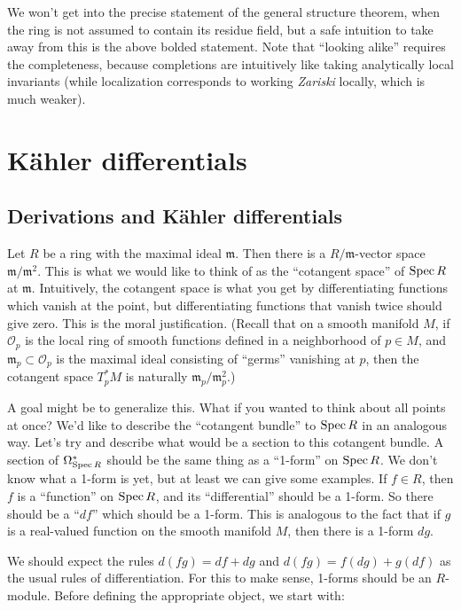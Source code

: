 We won't get into the precise statement of the general structure theorem, when
the ring is not assumed to contain its residue field, but a safe
intuition to take away from this is the above bolded statement.
Note that ``looking alike'' requires the completeness, because completions are
intuitively like taking analytically local invariants (while localization
corresponds to working \emph{Zariski} locally, which is much weaker).


\section{K\"ahler differentials}
\subsection{Derivations and K\"ahler differentials} Let $R$ be a ring with the maximal ideal
$\mathfrak{m}$. Then there is a $R/\mathfrak{m}$-vector space
$\mathfrak{m}/\mathfrak{m}^2$. This is what we would like to think of as the
``{cotangent space}'' of $\operatorname{Spec} R$ at $\mathfrak{m}$. Intuitively, the
cotangent space is what you get by differentiating functions which vanish at
the point, but
differentiating functions that vanish twice should give zero. This is the moral
justification.
(Recall that on a smooth manifold $M$, if $\mathcal{O}_p$ is the local ring of
smooth functions defined in a neighborhood of $p \in M$, and $\mathfrak{m}_p
\subset \mathcal{O}_p$ is the maximal ideal consisting of ``germs'' vanishing
at $p$, then the cotangent space $T_p^* M$ is naturally
$\mathfrak{m}_p/\mathfrak{m}_p^2$.)

A goal might be to generalize this. What if you wanted to think about all
points at once? We'd like to describe the ``cotangent bundle'' to $\operatorname{Spec} R$ in
an analogous way. Let's try and describe what would be a section to this
cotangent bundle. A section of $\Omega^*_{\operatorname{Spec} R}$ should be the same
thing as a ``1-form'' on $\operatorname{Spec} R$. We don't know what a 1-form is yet, but at
least we can give some examples. If $f \in R$, then $f$ is a ``function'' on
$\operatorname{Spec} R$, and its ``differential'' should be a 1-form. So there should be a
``$df$'' which should be a 1-form. 
This is analogous to the fact that if $g$ is a real-valued function on the
smooth manifold $M$, then there is a 1-form $dg$.

We should expect the rules $d(fg)= df+dg$ and $d(fg) = f(dg) + g(df)$ as the
usual rules of differentiation. For this to make sense, 1-forms should be an
$R$-module. 
Before defining the appropriate object, we start with:


